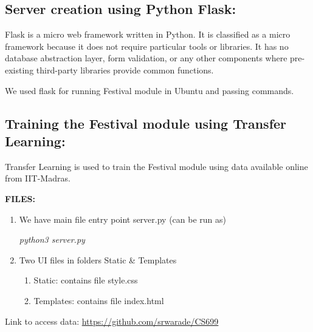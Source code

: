 \documentclass{article}
\begin{document}
\subsection{Server creation using Python Flask:}

\large \cite{stackoverflow}Flask is a micro web framework written in Python. It is classified as a micro framework because it does not require particular tools or libraries. It has no database abstraction layer, form validation, or any other components where pre-existing third-party libraries provide common functions.\par

We used flask for running Festival module in Ubuntu and passing commands.

\bigskip

\subsection{Training the Festival module using Transfer Learning:}
\large Transfer Learning is used to train the Festival module using data available online from IIT-Madras. 

\bigskip
\newpage
\textbf{FILES:}
\begin{enumerate}
    \item \Large We have main file entry point server.py (can be run as)
    
    \begin{displayquote}
        \textit{python3 server.py}
    \end{displayquote}
    
    \item \Large Two UI files in folders Static & Templates 
        \begin{enumerate}
            \item Static: 
                contains file style.css
            \item Templates: 
                contains file index.html
        \end{enumerate}
    
\end{enumerate}

\large Link to access data: \url{https://github.com/srwarade/CS699}


\newpage
\end{document}
